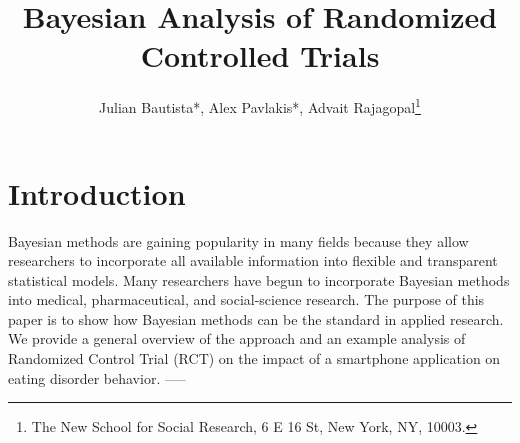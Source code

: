 \documentclass[12pt, oneside]{article}
\title{Bayesian Analysis of Randomized Controlled Trials}
\author{Julian Bautista*, Alex Pavlakis*, Advait Rajagopal\footnote{The New School for Social Research, 6 E 16 St, New York, NY, 10003.}}
\begin{document}
\maketitle

\abstract{}	

\newpage 

\tableofcontents
\newpage

\section{Introduction}
Bayesian methods are gaining popularity in many fields because they allow researchers to incorporate all available information into flexible and transparent statistical models.  Many researchers have begun to incorporate Bayesian methods into medical, pharmaceutical, and social-science research.  The purpose of this paper is to show how Bayesian methods can be the standard in applied research.  We provide a general overview of the approach and an example analysis of Randomized Control Trial (RCT) on the impact of a smartphone application on eating disorder behavior.  
-----
\end{document}
